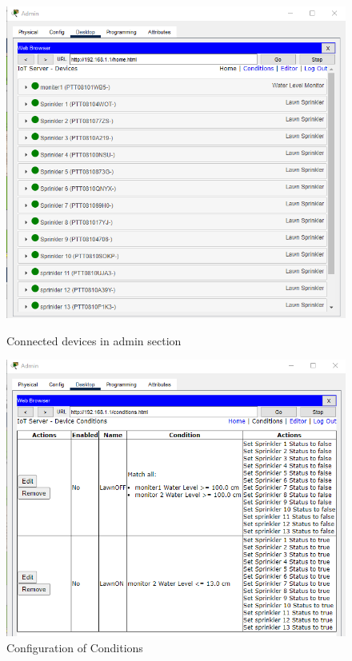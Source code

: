 \documentclass{report}
\begin{document}
\begin{figure}[h]
    \centering
    
    \begin{minipage}{0.45\textwidth}
    \centering
    \includegraphics[width=1\textwidth]{As/3a.png}
    \caption{Connected devices in admin section}
    \label{fig:10}
    \end{minipage}
    \hfill
    \begin{minipage}{0.45\textwidth}
    \centering
    \includegraphics[width=1\textwidth]{As/4a.png}
    \caption{Configuration of Conditions}
    \label{fig:11}
    \end{minipage}


\end{figure}
\end{document}
